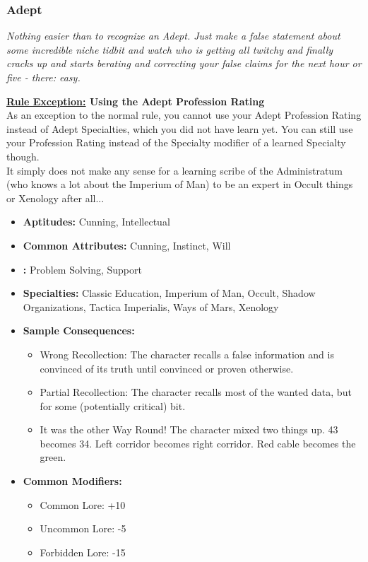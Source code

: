 	\subsubsection{Adept}\label{Adept}
		\textit{Nothing easier than to recognize an Adept.
		Just make a false statement about some incredible niche tidbit and watch who is getting all twitchy and finally cracks up and starts berating and correcting your false claims for the next hour or five - there: easy.}
		\begin{DndReadAloud}
		\textbf{\underline{Rule Exception:} Using the Adept Profession Rating}\\
		As an exception to the normal rule, you cannot use your Adept Profession Rating instead of Adept Specialties, which you did not have learn yet. You can still use your Profession Rating instead of the Specialty modifier of a learned Specialty though.\\
		It simply does not make any sense for a learning scribe of the Administratum (who knows a lot about the Imperium of Man) to be an expert in Occult things or Xenology after all...
		\end{DndReadAloud}
		\begin{itemize}
			\item \textbf{Aptitudes:} Cunning, Intellectual
			\item \textbf{Common Attributes:} Cunning, Instinct, Will
			\item \textbf{:} Problem Solving, Support
			\item \textbf{Specialties:} Classic Education, Imperium of Man, Occult, Shadow Organizations, Tactica Imperialis, Ways of Mars, Xenology
			\item \textbf{Sample Consequences:} 
			\begin{itemize}
				\item Wrong Recollection: The character recalls a false information and is convinced of its truth until convinced or proven otherwise.
				\item Partial Recollection: The character recalls most of the wanted data, but for some (potentially critical) bit.
				\item It was the other Way Round! The character mixed two things up. 43 becomes 34. Left corridor becomes right corridor. Red cable becomes the green.
			\end{itemize}
			\item \textbf{Common Modifiers:}
			\begin{itemize}
				\item Common Lore: +10
				\item Uncommon Lore: -5
				\item Forbidden Lore: -15
			\end{itemize}
		\end{itemize}

